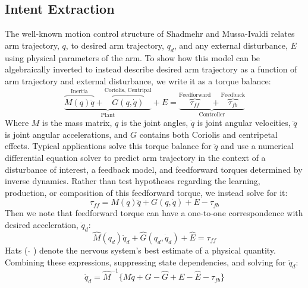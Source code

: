 \documentclass[letterpaper, 10 pt, conference]{ieeeconf}  %
\begin{document}
\subsection{Intent Extraction}
The well-known motion control structure of Shadmehr and Mussa-Ivaldi\cite{shadmehr1994adaptive} relates arm trajectory, $q$, to desired arm trajectory, $q_d$, and any external disturbance, $E$ using physical parameters of the arm. To show how this model can be algebraically inverted to instead describe desired arm trajectory as a function of arm trajectory and external disturbance, we write it as a torque balance:
\begin{equation}
\underbrace{\overbrace{M(q)\ddot{q}}^{\text{Inertia}}+\overbrace{G(q,\dot{q})}^{\text{Coriolis, Centripal}}}_{\text{Plant}}+E=
\underbrace{\overbrace{\tau_{ff}}^{\text{Feedforward}}+\overbrace{\tau_{fb}}^{\text{Feedback}}}_\text{Controller}
\end{equation}
Where $M$ is the mass matrix, $q$ is the joint angles, $\dot{q}$ is joint angular velocities, $\ddot{q}$ is joint angular accelerations, and $G$ contains both Coriolis and centripetal effects. Typical applications solve this torque balance for $\ddot{q}$ and use a numerical differential equation solver to predict arm trajectory in the context of a disturbance of interest, a feedback model, and feedforward torques determined by inverse dynamics. Rather than test hypotheses regarding the learning, production, or composition of this feedforward torque, we instead solve for it:
\begin{equation}
\tau_{ff}=M(q)\ddot{q}+G(q,\dot{q})+E-\tau_{fb}
\end{equation}
Then we note that feedforward torque can have a one-to-one correspondence with desired acceleration, $\ddot{q}_d$:
\begin{equation}
\hat{M}(q_d)\ddot{q}_d+\hat{G}(q_d,\dot{q}_d)+\hat{E}=\tau_{ff}
\end{equation}
Hats ( $\hat{}$ ) denote the nervous system's best estimate of a physical quantity. Combining these expressions, suppressing state dependencies, and solving for $\ddot{q}_d$:
\begin{equation}
\ddot{q}_d=\hat{M}^{-1} \{M\ddot{q}+G-\hat{G}+E-\hat{E}-\tau_{fb}\}
\end{equation}
\end{document}
